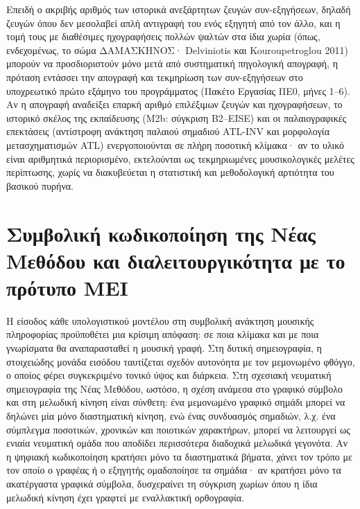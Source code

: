 \documentclass[11pt,a4paper]{article}
\begin{document}
Επειδή ο ακριβής αριθμός των ιστορικά ανεξάρτητων ζευγών συν-εξηγήσεων, δηλαδή ζευγών όπου δεν μεσολαβεί απλή αντιγραφή του ενός εξηγητή από τον άλλο, και η τομή τους με διαθέσιμες ηχογραφήσεις πολλών ψαλτών στα ίδια χωρία (όπως, ενδεχομένως, το σώμα ΔΑΜΑΣΚΗΝΟΣ· Delviniotis και Kouroupetroglou 2011) μπορούν να προσδιοριστούν μόνο μετά από συστηματική πηγολογική απογραφή, η πρόταση εντάσσει την απογραφή και τεκμηρίωση των συν-εξηγήσεων στο υποχρεωτικό πρώτο εξάμηνο του προγράμματος (Πακέτο Εργασίας ΠΕ0, μήνες 1--6). Αν η απογραφή αναδείξει επαρκή αριθμό επιλέξιμων ζευγών και ηχογραφήσεων, το ιστορικό σκέλος της εκπαίδευσης (Μ2b: σύγκριση B2--EISE) και οι παλαιογραφικές επεκτάσεις (αντίστροφη ανάκτηση παλαιού σημαδιού ATL-INV και μορφολογία μετασχηματισμών ATL) ενεργοποιούνται σε πλήρη ποσοτική κλίμακα· αν το υλικό είναι αριθμητικά περιορισμένο, εκτελούνται ως τεκμηριωμένες μουσικολογικές μελέτες περίπτωσης, χωρίς να διακυβεύεται η στατιστική και μεθοδολογική αρτιότητα του βασικού πυρήνα.

\section{Συμβολική κωδικοποίηση της Νέας Μεθόδου και διαλειτουργικότητα με το πρότυπο MEI}

Η είσοδος κάθε υπολογιστικού μοντέλου στη συμβολική ανάκτηση μουσικής πληροφορίας προϋποθέτει μια κρίσιμη απόφαση: σε ποια κλίμακα και με ποια γνωρίσματα θα αναπαρασταθεί η μουσική γραφή. Στη δυτική σημειογραφία, η στοιχειώδης μονάδα εισόδου ταυτίζεται σχεδόν αυτονόητα με τον μεμονωμένο φθόγγο, ο οποίος φέρει συγκεκριμένο τονικό ύψος και διάρκεια. Στη σχεσιακή νευματική σημειογραφία της Νέας Μεθόδου, ωστόσο, η σχέση ανάμεσα στο γραφικό σύμβολο και στη μελωδική κίνηση είναι σύνθετη: ένα μεμονωμένο γραφικό σημάδι μπορεί να δηλώνει μία μόνο διαστηματική κίνηση, ενώ ένας συνδυασμός σημαδιών, λ.χ. ένα σύμπλεγμα ποσοτικών, χρονικών και ποιοτικών χαρακτήρων, μπορεί να λειτουργεί ως ενιαία νευματική ομάδα που αποδίδει περισσότερα διαδοχικά μελωδικά γεγονότα. Αν η ψηφιακή κωδικοποίηση κρατήσει μόνο τα διαστηματικά βήματα, χάνει τον τρόπο με τον οποίο ο γραφέας ή ο εξηγητής ομαδοποίησε τα σημάδια· αν κρατήσει μόνο τα ακατέργαστα γραφικά σύμβολα, δυσχεραίνει τη σύγκριση χωρίων όπου η ίδια μελωδική κίνηση έχει γραφτεί με εναλλακτική ορθογραφία.
\end{document}
